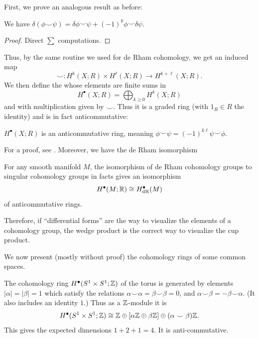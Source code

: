 First, we prove an analogous result as before:
\begin{lemma}
	We have
	$\delta(\phi\smile\psi) = \delta\phi\smile\psi
	+ (-1)^k\phi\smile\delta\psi$.
\end{lemma}
\begin{proof}
	Direct $\sum$ computations.
\end{proof}
Thus, by the same routine we used for de Rham cohomology, we get
an induced map
\[ \smile \colon H^k(X;R) \times H^\ell(X;R) \to H^{k+\ell}(X;R).  \]
We then define the 
whose elements are finite sums in
\[ H^\bullet(X;R) = \bigoplus_{k \ge 0} H^k(X;R) \]
and with multiplication given by $\smile$.
Thus it is a graded ring (with $1_R \in R$ the identity)
and is in fact anticommutative:
\begin{proposition}
	$H^\bullet(X; R)$ is an anticommutative ring,
	meaning $\phi \smile \psi = (-1)^{k\ell} \psi \smile \phi$.
\end{proposition}
For a proof, see \cite[Theorem 3.11, pages 210-212]{ref:hatcher}.
Moreover, we have the de Rham isomorphism
\begin{theorem}
	For any smooth manifold $M$, the isomorphism
	of de Rham cohomology groups to singular cohomology
	groups in facts gives an isomorphism
	\[ H^\bullet(M; \mathbb R) \cong H_{\mathrm{dR}}^\bullet(M) \]
	of anticommutative rings.
\end{theorem}

Therefore, if ``differential forms'' are the way to visualize
the elements of a cohomology group, the wedge product is the
correct way to visualize the cup product.

We now present (mostly without proof)
the cohomology rings of some common spaces.

\begin{example}
	The cohomology ring $H^\bullet(S^1 \times S^1; \mathbb Z)$
	of the torus is generated by elements $|\alpha| = |\beta| = 1$
	which satisfy the relations
	$\alpha \smile \alpha = \beta \smile \beta = 0$,
	and $\alpha \smile \beta = -\beta \smile \alpha$.
	(It also includes an identity $1$.)
	Thus as a $\mathbb Z$-module it is
	\[ H^\bullet(S^1 \times S^1; \mathbb Z)
		\cong \mathbb Z \oplus \left[ \alpha \mathbb Z \oplus \beta \mathbb Z \right]
		\oplus (\alpha \smile \beta) \mathbb Z. \]
	This gives the expected dimensions $1+2+1=4$.
	It is anti-commutative.
\end{example}

